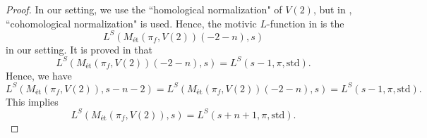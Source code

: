\documentclass[11pt, a4paper]{amsart}
\theoremstyle{plain}
\theoremstyle{definition}
\numberwithin{equation}{section}
\begin{document}
\begin{proof}
     In our setting, we use the ``homological normalization" of $V(2)$, but in \cite{LR92}, ``cohomological normalization" is used. Hence, the motivic $L$-function in \cite{LR92} is the 
     \begin{equation*}
        L^{S}(M_{\text{\'{e}t}}(\pi_f, V(2))(-2-n), s)
    \end{equation*}
     in our setting. It is proved in \cite[Theorem A, P291]{LR92} that 
     \begin{equation*}
          L^{S}(M_{\text{\'{e}t}}(\pi_f, V(2))(-2-n), s) = L^{S}(s - 1, \pi, \mathrm{std}).
     \end{equation*}
     Hence, we have 
     \begin{equation*}
         L^{S}(M_{\text{\'{e}t}}(\pi_f, V(2)), s - n - 2) =  L^{S}(M_{\text{\'{e}t}}(\pi_f, V(2))(-2-n), s) = L^{S}(s - 1, \pi, \mathrm{std}). 
     \end{equation*}
     This implies
     \begin{equation*}
          L^{S}(M_{\text{\'{e}t}}(\pi_f, V(2)), s) = L^{S}(s + n + 1, \pi, \mathrm{std}). 
     \end{equation*}
\end{proof}
\end{document}
